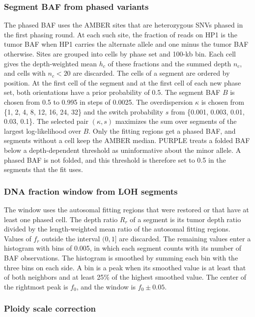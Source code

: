 \documentclass[pdflatex,sn-nature]{sn-jnl}
\begin{document}
\subsubsection{Segment BAF from phased variants}

The phased BAF uses the AMBER sites that are heterozygous SNVs phased in the first phasing round. At each such site, the fraction of reads on HP1 is the tumor BAF when HP1 carries the alternate allele and one minus the tumor BAF otherwise. Sites are grouped into cells by phase set and 100-kb bin. Each cell gives the depth-weighted mean $h_c$ of these fractions and the summed depth $n_c$, and cells with $n_c < 20$ are discarded. The cells of a segment are ordered by position. At the first cell of the segment and at the first cell of each new phase set, both orientations have a prior probability of 0.5. The segment BAF $B$ is chosen from 0.5 to 0.995 in steps of 0.0025. The overdispersion $\kappa$ is chosen from \{1, 2, 4, 8, 12, 16, 24, 32\} and the switch probability $s$ from \{0.001, 0.003, 0.01, 0.03, 0.1\}. The selected pair $(\kappa, s)$ maximizes the sum over segments of the largest log-likelihood over $B$. Only the fitting regions get a phased BAF, and segments without a cell keep the AMBER median. PURPLE treats a folded BAF below a depth-dependent threshold as uninformative about the minor allele. A phased BAF is not folded, and this threshold is therefore set to 0.5 in the segments that the fit uses.

\subsubsection{DNA fraction window from LOH segments}

The window uses the autosomal fitting regions that were restored or that have at least one phased cell. The depth ratio $R_r$ of a segment is its tumor depth ratio divided by the length-weighted mean ratio of the autosomal fitting regions. Values of $f_r$ outside the interval $(0, 1]$ are discarded. The remaining values enter a histogram with bins of 0.005, in which each segment counts with its number of BAF observations. The histogram is smoothed by summing each bin with the three bins on each side. A bin is a peak when its smoothed value is at least that of both neighbors and at least 25\% of the highest smoothed value. The center of the rightmost peak is $f_0$, and the window is $f_0 \pm 0.05$.

\subsubsection{Ploidy scale correction}
\end{document}
